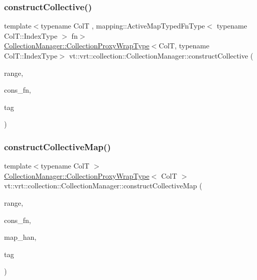 \subsubsection{\texorpdfstring{construct\+Collective()}{constructCollective()}\hspace{0.1cm}{\footnotesize\ttfamily [6/6]}}
{\footnotesize\ttfamily template$<$typename ColT , mapping\+::\+Active\+Map\+Typed\+Fn\+Type$<$ typename Col\+T\+::\+Index\+Type $>$ fn$>$ \\
\hyperlink{structvt_1_1vrt_1_1collection_1_1_collection_manager_a56458ed7f9bb22b631b9b3a745f42f94}{Collection\+Manager\+::\+Collection\+Proxy\+Wrap\+Type}$<$ColT, typename Col\+T\+::\+Index\+Type$>$ vt\+::vrt\+::collection\+::\+Collection\+Manager\+::construct\+Collective (\begin{DoxyParamCaption}\item[{typename Col\+T\+::\+Index\+Type}]{range,  }\item[{\hyperlink{structvt_1_1vrt_1_1collection_1_1_collection_manager_a7503830bc133013d542856fa39834dcc}{Distrib\+Construct\+Fn}$<$ ColT $>$}]{cons\+\_\+fn,  }\item[{\hyperlink{namespacevt_a84ab281dae04a52a4b243d6bf62d0e52}{Tag\+Type} const \&}]{tag }\end{DoxyParamCaption})}

\mbox{\label{structvt_1_1vrt_1_1collection_1_1_collection_manager_a1c6fff21fb84e87d1b52b07f92805725}} 
\subsubsection{\texorpdfstring{construct\+Collective\+Map()}{constructCollectiveMap()}}
{\footnotesize\ttfamily template$<$typename ColT $>$ \\
\hyperlink{structvt_1_1vrt_1_1collection_1_1_collection_manager_a56458ed7f9bb22b631b9b3a745f42f94}{Collection\+Manager\+::\+Collection\+Proxy\+Wrap\+Type}$<$ ColT $>$ vt\+::vrt\+::collection\+::\+Collection\+Manager\+::construct\+Collective\+Map (\begin{DoxyParamCaption}\item[{typename Col\+T\+::\+Index\+Type}]{range,  }\item[{\hyperlink{structvt_1_1vrt_1_1collection_1_1_collection_manager_a7503830bc133013d542856fa39834dcc}{Distrib\+Construct\+Fn}$<$ ColT $>$}]{cons\+\_\+fn,  }\item[{\hyperlink{namespacevt_af64846b57dfcaf104da3ef6967917573}{Handler\+Type} const}]{map\+\_\+han,  }\item[{\hyperlink{namespacevt_a84ab281dae04a52a4b243d6bf62d0e52}{Tag\+Type} const \&}]{tag }\end{DoxyParamCaption})}



